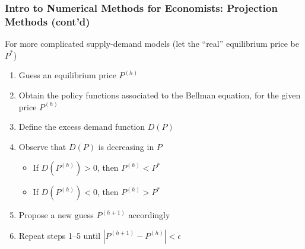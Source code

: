 \documentclass[10pt, aspectratio=1610]{beamer}
\begin{document}
  \begin{frame}
    \frametitle{Intro to Numerical Methods for Economists: Projection Methods (cont'd)}

    For more complicated supply-demand models (let the ``real'' equilibrium price be $P^*$)
    \begin{enumerate}
      \item Guess an equilibrium price $P^{(h)}$
      \item Obtain the policy functions associated to the Bellman equation, for the given price $P^{(h)}$
      \item Define the excess demand function $D(P)$
      \item Observe that $D(P)$ is decreasing in $P$
        \begin{itemize}
          \item If $D(P^{(h)}) > 0$, then $P^{(h)} < P^*$
          \item If $D(P^{(h)}) < 0$, then $P^{(h)} > P^*$
        \end{itemize}
      \item Propose a new guess $P^{(h+1)}$ accordingly
      \item Repeat steps 1--5 until $| P^{(h+1)} - P^{(h)} | < \epsilon$
    \end{enumerate}

  \end{frame}
\end{document}
